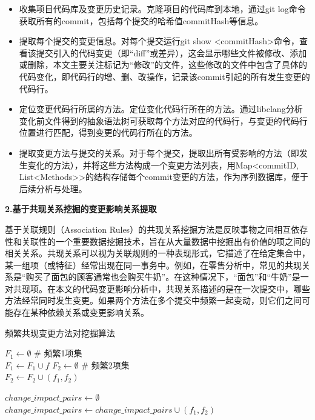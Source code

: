 \begin{itemize}
    \item 收集项目代码库及变更历史记录。克隆项目的代码库到本地，通过git log命令获取所有的commit，包括每个提交的哈希值commitHash等信息。
    \item 提取每个提交的变更信息。对每个提交运行git show <commitHash>命令，查看该提交引入的代码变更（即“diff”或差异），这会显示哪些文件被修改、添加或删除，本文主要关注标记为“修改”的文件，这些修改的文件中包含了具体的代码变化，即代码行的增、删、改操作，记录该commit引起的所有发生变更的代码行。
    \item 定位变更代码行所属的方法。定位变化代码行所在的方法。通过libclang分析变化前文件得到的抽象语法树可获取每个方法对应的代码行，与变更的代码行位置进行匹配，得到变更的代码行所在的方法。
    \item 提取变更方法与提交的关系。对于每个提交，提取出所有受影响的方法（即发生变化的方法），并将这些方法构成一个变更方法列表，用Map<commitID, List<Methods>>的结构存储每个commit变更的方法，作为序列数据库，便于后续分析与处理。
    
\end{itemize}

\noindent \textbf{2.基于共现关系挖掘的变更影响关系提取}

基于关联规则（Association Rules）的共现关系挖掘方法是反映事物之间相互依存性和关联性的一个重要数据挖掘技术，旨在从大量数据中挖掘出有价值的项之间的相关关系。共现关系可以视为关联规则的一种表现形式，它描述了在给定集合中，某一组项（或特征）经常出现在同一事务中。例如，在零售分析中，常见的共现关系是“购买了面包的顾客通常也会购买牛奶”。在这种情况下，“面包”和“牛奶”是一对共现项。在本文的代码变更影响分析中，共现关系描述的是在一次提交中，哪些方法经常同时发生变更。如果两个方法在多个提交中频繁一起变动，则它们之间可能存在某种依赖关系或变更影响关系。

\begin{algorithm}[h]
    \caption{频繁共现变更方法对挖掘算法}
    \label{同时变更方法对挖掘算法}
     $F_1 \gets \emptyset$  \# 频繁1项集\\  
     {
         {
            $F_1 \gets F_1 \cup f$
        }
    } 
    $F_2 \gets \emptyset$  \# 频繁2项集\\ 
     {
         {
            $F_2 \gets F_2 \cup (f_1, f_2)$
        }
    }
    
    $change\_impact\_pairs \gets \emptyset$ \\ 
     {
         {
            $change\_impact\_pairs \gets change\_impact\_pairs \cup (f_1, f_2)$
        }
    }
    \end{algorithm}


